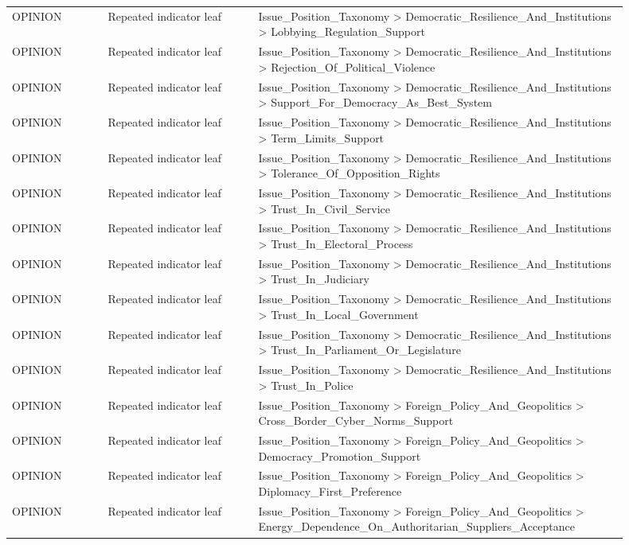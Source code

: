 \begin{table}[htbp]
\begin{threeparttable}
\begin{tabular}{p{0.14\linewidth}p{0.22\linewidth}p{0.54\linewidth}}
OPINION & Repeated indicator leaf & Issue\_Position\_Taxonomy > Democratic\_Resilience\_And\_Institutions > Lobbying\_Regulation\_Support \\
OPINION & Repeated indicator leaf & Issue\_Position\_Taxonomy > Democratic\_Resilience\_And\_Institutions > Rejection\_Of\_Political\_Violence \\
OPINION & Repeated indicator leaf & Issue\_Position\_Taxonomy > Democratic\_Resilience\_And\_Institutions > Support\_For\_Democracy\_As\_Best\_System \\
OPINION & Repeated indicator leaf & Issue\_Position\_Taxonomy > Democratic\_Resilience\_And\_Institutions > Term\_Limits\_Support \\
OPINION & Repeated indicator leaf & Issue\_Position\_Taxonomy > Democratic\_Resilience\_And\_Institutions > Tolerance\_Of\_Opposition\_Rights \\
OPINION & Repeated indicator leaf & Issue\_Position\_Taxonomy > Democratic\_Resilience\_And\_Institutions > Trust\_In\_Civil\_Service \\
OPINION & Repeated indicator leaf & Issue\_Position\_Taxonomy > Democratic\_Resilience\_And\_Institutions > Trust\_In\_Electoral\_Process \\
OPINION & Repeated indicator leaf & Issue\_Position\_Taxonomy > Democratic\_Resilience\_And\_Institutions > Trust\_In\_Judiciary \\
OPINION & Repeated indicator leaf & Issue\_Position\_Taxonomy > Democratic\_Resilience\_And\_Institutions > Trust\_In\_Local\_Government \\
OPINION & Repeated indicator leaf & Issue\_Position\_Taxonomy > Democratic\_Resilience\_And\_Institutions > Trust\_In\_Parliament\_Or\_Legislature \\
OPINION & Repeated indicator leaf & Issue\_Position\_Taxonomy > Democratic\_Resilience\_And\_Institutions > Trust\_In\_Police \\
OPINION & Repeated indicator leaf & Issue\_Position\_Taxonomy > Foreign\_Policy\_And\_Geopolitics > Cross\_Border\_Cyber\_Norms\_Support \\
OPINION & Repeated indicator leaf & Issue\_Position\_Taxonomy > Foreign\_Policy\_And\_Geopolitics > Democracy\_Promotion\_Support \\
OPINION & Repeated indicator leaf & Issue\_Position\_Taxonomy > Foreign\_Policy\_And\_Geopolitics > Diplomacy\_First\_Preference \\
OPINION & Repeated indicator leaf & Issue\_Position\_Taxonomy > Foreign\_Policy\_And\_Geopolitics > Energy\_Dependence\_On\_Authoritarian\_Suppliers\_Acceptance \\

\end{tabular}
\end{threeparttable}
\end{table}
